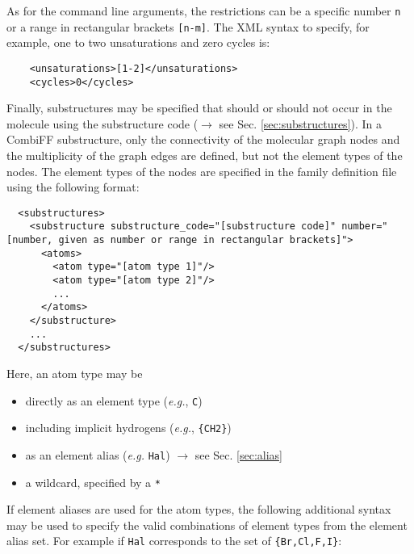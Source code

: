 \documentclass[a4paper,11pt]{article}
\begin{document}
As for the command line arguments, the restrictions can be a specific number \texttt{n} or a range in rectangular brackets \texttt{[n-m]}. The XML syntax to specify, for example, one to two unsaturations and zero cycles is:

\begin{lstlisting}
    <unsaturations>[1-2]</unsaturations>
    <cycles>0</cycles>
\end{lstlisting}

Finally, substructures may be specified that should or should not occur in the molecule using the substructure code ($\rightarrow$ see Sec. \ref{sec:substructures}). In a CombiFF substructure, only the connectivity of the molecular graph nodes and the multiplicity of the graph edges are defined, but not the element types of the nodes. The element types of the nodes are specified in the family definition file using the following format:

\begin{lstlisting}
  <substructures>
    <substructure substructure_code="[substructure code]" number="[number, given as number or range in rectangular brackets]">
      <atoms>
        <atom type="[atom type 1]"/>
        <atom type="[atom type 2]"/>
        ...
      </atoms>
    </substructure>
    ...
  </substructures>
\end{lstlisting}

Here, an atom type may be
\begin{itemize}
  \item directly as an element type (\textit{e.g.}, \texttt{C})
  \item including implicit hydrogens (\textit{e.g.}, \texttt{\{CH2\}})
  \item as an element alias (\textit{e.g.} \texttt{Hal}) $\rightarrow$ see Sec. \ref{sec:alias}
  \item a wildcard, specified by a \texttt{*}
\end{itemize}

If element aliases are used for the atom types, the following additional syntax may be used to specify the valid combinations of element types from the element alias set. For example if \texttt{Hal} corresponds to the set of \texttt{\{Br,Cl,F,I\}}:
\end{document}
